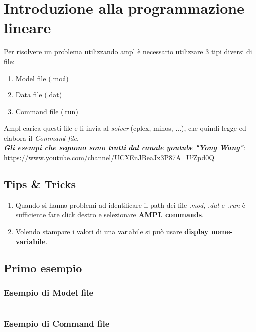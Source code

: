 \documentclass[\main/main.tex]{subfiles}
\begin{document}
%

\section{Introduzione alla programmazione lineare}
Per risolvere un problema utilizzando ampl è necessario utilizzare 3 tipi diversi di file:

\begin{enumerate}
\item Model file (.mod)
\item Data file (.dat)
\item Command file (.run)
\end{enumerate}

Ampl carica questi file e li invia al \textit{solver} (cplex, minos, ...), che quindi legge ed elabora il \textit{Command file}.
\\

\vspace{1em}
\textbf{\textit{Gli esempi che seguono sono tratti dal canale youtube "Yong Wang"}}: \url{https://www.youtube.com/channel/UCXEnJBeaJx3P87A_UfZpd0Q}

\subsection{Tips \& Tricks}
\begin{enumerate}
\item Quando si hanno problemi ad identificare il path dei file \textit{.mod}, \textit{.dat} e \textit{.run} è sufficiente fare click destro e selezionare \textbf{AMPL commands}.
\item Volendo stampare i valori di una variabile si può usare \textbf{display nome-variabile}.
\end{enumerate}

\subsection{Primo esempio}

\subsubsection{Esempio di Model file}
\inputminted{ampl}{\main/chapters/ampl/es1/example1.mod}

\subsubsection{Esempio di Command file}
\inputminted{ampl}{\main/chapters/ampl/es1/example1.run}
\end{document}
